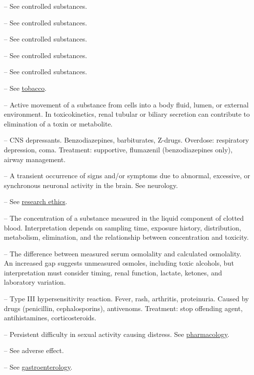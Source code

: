 -- See controlled substances.

-- See controlled substances.

-- See controlled substances.

-- See controlled substances.

-- See controlled substances.

-- See \hyperlink{Tobacco}{tobacco}.

-- Active movement of a substance from cells into a body fluid, lumen, or external environment. In toxicokinetics, renal tubular or biliary secretion can contribute to elimination of a toxin or metabolite.

-- CNS depressants. Benzodiazepines, barbiturates, Z-drugs. Overdose: respiratory depression, coma. Treatment: supportive, flumazenil (benzodiazepines only), airway management.

-- A transient occurrence of signs and/or symptoms due to abnormal, excessive, or synchronous neuronal activity in the brain. See neurology.

-- See \hyperlink{Research Ethics}{research ethics}.

-- The concentration of a substance measured in the liquid component of clotted blood. Interpretation depends on sampling time, exposure history, distribution, metabolism, elimination, and the relationship between concentration and toxicity.

-- The difference between measured serum osmolality and calculated osmolality. An increased gap suggests unmeasured osmoles, including toxic alcohols, but interpretation must consider timing, renal function, lactate, ketones, and laboratory variation.

-- Type III hypersensitivity reaction. Fever, rash, arthritis, proteinuria. Caused by drugs (penicillin, cephalosporins), antivenoms. Treatment: stop offending agent, antihistamines, corticosteroids.

-- Persistent difficulty in sexual activity causing distress. See \hyperlink{Pharmacology}{pharmacology}.

-- See adverse effect.

-- See \hyperlink{Gastroenterology}{gastroenterology}.

